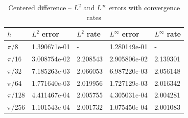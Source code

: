 \documentclass{homework}
\begin{document}
\begin{alphaparts}
		\begin{table}[h]
			\centering
			\begin{tabular}{@{}lllll@{}}
				\toprule
				$h$ & $L^2$ error & $L^2$ rate & $L^\infty$ error & $L^\infty$ rate \\
				\midrule
				$\pi$/8 & 1.390671e-01 & - & 1.280149e-01 & -\\
				$\pi$/16 & 3.008754e-02 & 2.208543 & 2.905806e-02 & 2.139301\\
				$\pi$/32 & 7.185263e-03 & 2.066053 & 6.987220e-03 & 2.056148\\
				$\pi$/64 & 1.771640e-03 & 2.019956 & 1.727129e-03 & 2.016342\\
				$\pi$/128 & 4.411467e-04 & 2.005755 & 4.305031e-04 & 2.004281\\
				$\pi$/256 & 1.101543e-04 & 2.001732 & 1.075450e-04 & 2.001083\\
				\bottomrule
			\end{tabular}
			\caption{Centered difference -- $L^2$ and $L^\infty$ errors with convergence rates}
			\label{tab:p2b}
		\end{table}
		

\end{alphaparts}
\end{document}
